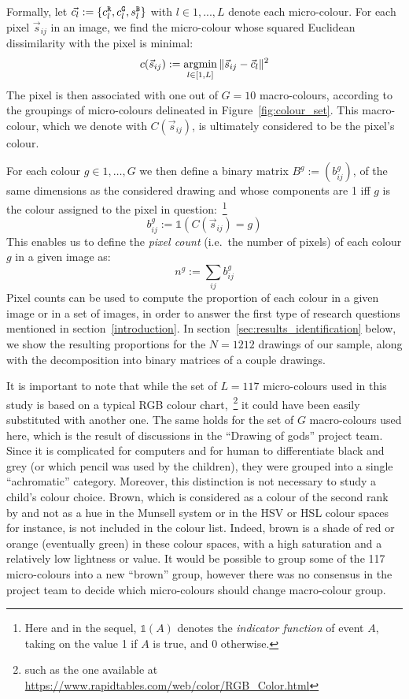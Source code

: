\documentclass[11pt,a4paper]{article}
\begin{document}
Formally, let \(\vec{c_l} := \{ c^{\tt \scriptstyle R}_{l}, c^{\tt \scriptstyle G}_{l}, s^{\tt \scriptstyle B}_{l} \}\) with $l \in 1, ..., L$ denote each micro-colour. For each pixel \(\vec{s}_{ij}\) in an image, we find the micro-colour whose squared Euclidean dissimilarity with the pixel is minimal:
\begin{equation*}
c(\vec{s}_{ij}) := \operatornamewithlimits{argmin}_{l \in [1,L]} \| \vec{s}_{ij} - \vec{c}_{l} \|^{2}
\end{equation*}
The pixel is then associated with one out of $G = 10$ macro-colours, according to the groupings of micro-colours delineated in Figure~\ref{fig:colour_set}. This macro-colour, which we denote with $C(\vec{s}_{ij})$, is ultimately considered to be the pixel's colour.

For each colour $g\in 1, \dots, G$ we then define a binary matrix $B^{g} := (b_{ij}^{g})$, of the same dimensions as the considered drawing and whose components are 1 iff $g$ is the colour assigned to the pixel in question:~\footnote{Here and in the sequel, $\mathds{1}(A)$ denotes the \textit{indicator function} of event $A$, taking on the value 1 if $A$ is true, and 0 otherwise.}
\begin{equation}
	b_{ij}^{g} := \mathds{1}(C(\vec{s}_{ij}) = g)
\end{equation}
This enables us to define the \textit{pixel count} (i.e.~the number of pixels) of each colour $g$ in a given image as:
\begin{equation}
	n^{g} := \sum_{ij}b_{ij}^{g}
\end{equation}
Pixel counts can be used to compute the proportion of each colour in a given image or in a set of images, in order to answer the first type of research questions mentioned in section~\ref{introduction}. In section~\ref{sec:results_identification} below, we show the resulting proportions for the $N = 1212$ drawings of our sample, along with the decomposition into binary matrices of a couple drawings.

It is important to note that while the set of $L=117$ micro-colours used in this study is based on a typical RGB colour chart,~\footnote{such as the one available at \url{https://www.rapidtables.com/web/color/RGB_Color.html}} it could have been easily substituted with another one. The same holds for the set of $G$ macro-colours used here, which is the result of discussions in the ``Drawing of gods'' project team. Since it is complicated for computers and for human to differentiate black and grey (or which pencil was used by the children), they were grouped into a single ``achromatic'' category. Moreover, this distinction is not necessary to study a child's colour choice. Brown, which is considered as a colour of the second rank by \citet{pastoureau2017} and not as a hue in the Munsell system or in the HSV or HSL colour spaces for instance, is not included in the colour list. Indeed, brown is a shade of red or orange (eventually green) in these colour spaces, with a high saturation and a relatively low lightness or value. It would be possible to group some of the 117 micro-colours into a new ``brown'' group, however there was no consensus in the project team to decide which micro-colours should change macro-colour group.
\end{document}
